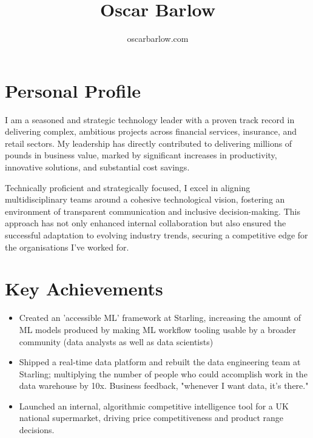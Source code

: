 \documentclass[a4paper]{scrartcl}
\date{}
\begin{document}

\title{Oscar Barlow}
\subtitle{oscarbarlow.com}
\maketitle

\section*{Personal Profile}
I am a seasoned and strategic technology leader with a proven track record in
delivering complex, ambitious projects across financial services, insurance,
and retail sectors. My leadership has directly contributed to delivering
millions of pounds in business value, marked by significant increases in
productivity, innovative solutions, and substantial cost savings.

Technically proficient and strategically focused, I excel in aligning
multidisciplinary
teams around a cohesive technological vision, fostering an environment of
transparent communication and inclusive decision-making. This approach has not
only enhanced internal collaboration but also ensured the successful adaptation
to evolving industry trends, securing a competitive edge for the organisations
I've worked for.

\section*{Key Achievements}
\begin{itemize}
      \item Created an 'accessible ML' framework at Starling, increasing the
            amount of ML models produced by making ML workflow tooling usable
            by
            a broader community (data analysts as well as data scientists)
      \item Shipped a real-time data platform and rebuilt the data engineering
            team at Starling; multiplying the number of people who could
            accomplish work in
            the data warehouse by 10x. Business feedback, "whenever I want
            data, it's
            there."
      \item Launched an internal, algorithmic competitive intelligence tool for
            a UK national supermarket, driving price competitiveness and
            product
            range decisions.
\end{itemize}
\end{document}
